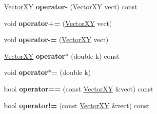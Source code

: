 \begin{DoxyCompactItemize}
\item 
\hypertarget{classVectorXY_a3e9b238c7a3a7c1dbffd02b841d32926}{}\hyperlink{classVectorXY}{Vector\+X\+Y} {\bfseries operator-\/} (\hyperlink{classVectorXY}{Vector\+X\+Y} vect) const \label{classVectorXY_a3e9b238c7a3a7c1dbffd02b841d32926}

\item 
\hypertarget{classVectorXY_a7206b9e67b835aa3d1bc02d58593e89d}{}void {\bfseries operator+=} (\hyperlink{classVectorXY}{Vector\+X\+Y} vect)\label{classVectorXY_a7206b9e67b835aa3d1bc02d58593e89d}

\item 
\hypertarget{classVectorXY_a4849b9c7d700cb33819fd9a67a7bdb65}{}void {\bfseries operator-\/=} (\hyperlink{classVectorXY}{Vector\+X\+Y} vect)\label{classVectorXY_a4849b9c7d700cb33819fd9a67a7bdb65}

\item 
\hypertarget{classVectorXY_aa54d52ee35bd9f23aacf9e40db864afe}{}\hyperlink{classVectorXY}{Vector\+X\+Y} {\bfseries operator$\ast$} (double k) const \label{classVectorXY_aa54d52ee35bd9f23aacf9e40db864afe}

\item 
\hypertarget{classVectorXY_aca23f07f70da97399ad83d6c1d025420}{}void {\bfseries operator$\ast$=} (double k)\label{classVectorXY_aca23f07f70da97399ad83d6c1d025420}

\item 
\hypertarget{classVectorXY_af815be1ddb6c8d4e9222791240549fbf}{}bool {\bfseries operator==} (const \hyperlink{classVectorXY}{Vector\+X\+Y} \&vect) const \label{classVectorXY_af815be1ddb6c8d4e9222791240549fbf}

\item 
\hypertarget{classVectorXY_ad288ee31a7ef0437962779fd631acd23}{}bool {\bfseries operator!=} (const \hyperlink{classVectorXY}{Vector\+X\+Y} \&vect) const \label{classVectorXY_ad288ee31a7ef0437962779fd631acd23}

\end{DoxyCompactItemize}
